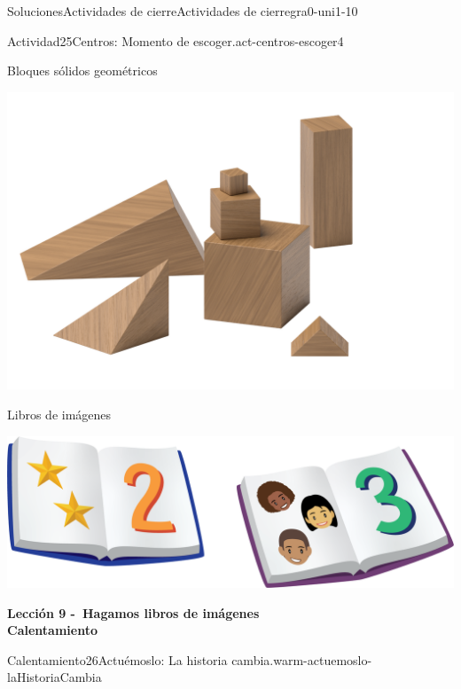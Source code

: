 \documentclass[twoside,10pt,]{article}
\begin{document}
\begin{solutions-section}{Soluciones}{Actividades de cierre}{}{Actividades de cierre}{}{}{gra0-uni1-10}
\begin{activitysolution}{Actividad}{25}{Centros: Momento de escoger.}{act-centros-escoger4}
\begin{sidebyside}{2}{0.025}{0.025}{0.05}
\begin{sbspanel}{0.45}
\end{sbspanel}%
\end{sidebyside}%
\begin{sidebyside}{2}{0.025}{0.025}{0.05}%
\begin{sbspanel}{0.45}%
Bloques sólidos geométricos%
\par
\includegraphics[width=\linewidth]{external/png-source/K.1.A Beta Student Workbook.Geoblocks.png}
\end{sbspanel}%
\begin{sbspanel}{0.45}%
Libros de imágenes%
\par
\includegraphics[width=\linewidth]{external/png-source/K.1.D Beta Student Workbooks.Books.png}
\end{sbspanel}%
\end{sidebyside}%
\end{activitysolution}%
\par\medskip
\noindent\textbf{\large{}\space\textperiodcentered\space{}Lección 9 -~Hagamos libros de imágenes\\
\space\textperiodcentered\space{}Calentamiento}
\begin{explorationsolution}{Calentamiento}{26}{Actuémoslo: La historia cambia.}{warm-actuemoslo-laHistoriaCambia}%
\begin{image}{0.2}{0.6}{0.2}{}%

\end{image}
\end{explorationsolution}
\end{solutions-section}
\end{document}
